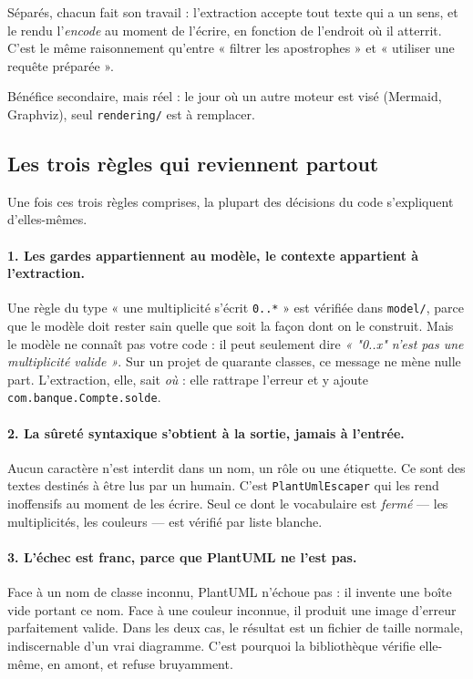 \documentclass[12pt, a4paper]{article}
\begin{document}
Séparés, chacun fait son travail : l'extraction accepte tout texte qui a un sens, et le rendu
l'\emph{encode} au moment de l'écrire, en fonction de l'endroit où il atterrit. C'est le même
raisonnement qu'entre « filtrer les apostrophes » et « utiliser une requête préparée ».

Bénéfice secondaire, mais réel : le jour où un autre moteur est visé (Mermaid, Graphviz), seul
\texttt{rendering/} est à remplacer.

\subsection{Les trois règles qui reviennent partout}

Une fois ces trois règles comprises, la plupart des décisions du code s'expliquent d'elles-mêmes.

\paragraph{1. Les gardes appartiennent au modèle, le contexte appartient à l'extraction.}
Une règle du type « une multiplicité s'écrit \texttt{0..*} » est vérifiée dans \texttt{model/},
parce que le modèle doit rester sain quelle que soit la façon dont on le construit. Mais le
modèle ne connaît pas votre code : il peut seulement dire \emph{« "0..x" n'est pas une
multiplicité valide »}. Sur un projet de quarante classes, ce message ne mène nulle part.
L'extraction, elle, sait \emph{où} : elle rattrape l'erreur et y ajoute
\texttt{com.banque.Compte.solde}.

\paragraph{2. La sûreté syntaxique s'obtient à la sortie, jamais à l'entrée.}
Aucun caractère n'est interdit dans un nom, un rôle ou une étiquette. Ce sont des textes
destinés à être lus par un humain. C'est \texttt{PlantUmlEscaper} qui les rend inoffensifs au
moment de les écrire. Seul ce dont le vocabulaire est \emph{fermé} — les multiplicités, les
couleurs — est vérifié par liste blanche.

\paragraph{3. L'échec est franc, parce que PlantUML ne l'est pas.}
Face à un nom de classe inconnu, PlantUML n'échoue pas : il invente une boîte vide portant ce
nom. Face à une couleur inconnue, il produit une image d'erreur parfaitement valide. Dans les
deux cas, le résultat est un fichier de taille normale, indiscernable d'un vrai diagramme.
C'est pourquoi la bibliothèque vérifie elle-même, en amont, et refuse bruyamment.
\end{document}
